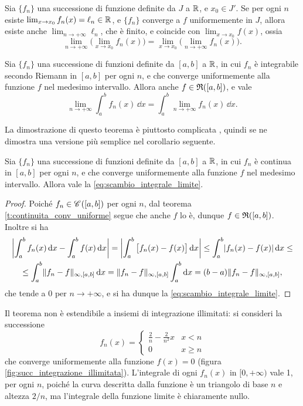 \begin{teorema} \label{t:doppio_limite}
Sia $\{f_n\}$ una successione di funzione definite da $J$ a $\R$, e $x_0\in J'$. Se per ogni $n$ esiste $\lim_{x\to x_0}f_n(x)=\ell_n\in\R$, e $\{f_n\}$ converge a $f$ uniformemente in $J$, allora esiste anche $\lim_{n\to+\infty}\ell_n$, che è finito, e coincide con $\lim_{x\to x_0}f(x)$, ossia
\begin{equation} \label{eq:doppio_limite}
\lim_{n\to+\infty}\Big(\lim_{x\to x_0}f_n(x)\Big)=\lim_{x\to x_0}\Big(\lim_{n\to+\infty}f_n(x)\Big).
\end{equation}
\end{teorema}
\begin{teorema} \label{t:scambio_integrale_limite}
Sia $\{f_n\}$ una successione di funzioni definite da $[a,b]$ a $\R$, in cui $f_n$ è integrabile secondo Riemann in $[a,b]$ per ogni $n$, e che converge uniformemente alla funzione $f$ nel medesimo intervallo. Allora anche $f\in\rie{[a,b]}$, e vale
\begin{equation} \label{eq:scambio_integrale_limite}
\lim_{n\to+\infty}\int_a^bf_n(x)\,\dd x=\int_a^b\lim_{n\to+\infty}f_n(x)\,\dd x.
\end{equation}
\end{teorema}
La dimostrazione di questo teorema è piuttosto complicata%
, quindi se ne dimostra una versione più semplice nel corollario seguente.
\begin{corollario}
Sia $\{f_n\}$ una successione di funzioni definite da $[a,b]$ a $\R$, in cui $f_n$ è continua in $[a,b]$ per ogni $n$, e che converge uniformemente alla funzione $f$ nel medesimo intervallo. Allora vale la \eqref{eq:scambio_integrale_limite}.
\end{corollario}
\begin{proof}
Poiché $f_n\in\cont{[a,b]}$ per ogni $n$, dal teorema \ref{t:continuita_conv_uniforme} segue che anche $f$ lo è, dunque $f\in\rie{[a,b]}$. Inoltre si ha
\begin{multline*}
	\abs[\bigg]{\int_a^bf_n(x)\,\dd x-\int_a^bf(x)\,\dd x}=\abs[\bigg]{\int_a^b\big[f_n(x)-f(x)\big]\,\dd x}\leq\int_a^b\abs{f_n(x)-f(x)}\,\dd x\leq\\
\leq\int_a^b\norm{f_n-f}_{\infty,[a,b]}\,\dd x=\norm{f_n-f}_{\infty,[a,b]}\int_a^b\dd x=(b-a)\norm{f_n-f}_{\infty,[a,b]},
\end{multline*}
che tende a 0 per $n\to+\infty$, e si ha dunque la \eqref{eq:scambio_integrale_limite}.
\end{proof}
Il teorema non è estendibile a insiemi di integrazione illimitati: si consideri la successione
\[
f_n(x)=\begin{cases}\frac2{n}-\frac2{n^2}x&x<n\\0&x\geq n\end{cases}
\]
che converge uniformemente alla funzione $f(x)=0$ (figura \ref{fig:succ_integrazione_illimitata}). L'integrale di ogni $f_n(x)$ in $[0,+\infty)$ vale 1, per ogni $n$, poiché la curva descritta dalla funzione è un triangolo di base $n$ e altezza $2/n$, ma l'integrale della funzione limite è chiaramente nullo.


